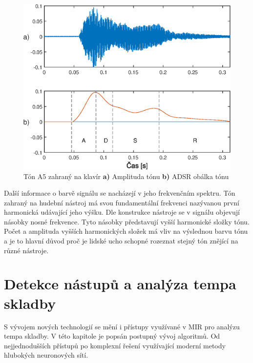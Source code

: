   \begin{figure}[H]
    \centering
    \includegraphics[width = 0.8\linewidth]{obrazky/ADSR.eps}
    \caption{Tón A5 zahraný na klavír \textbf{a)} Amplituda tónu \textbf{b)} ADSR obálka tónu}
    \label{fig:ADSR_envelope_on_piano_tone}
  \end{figure}

  Další informace o barvě signálu se nacházejí v jeho frekvenčním spektru. 
  Tón zahraný na hudební nástroj má svou fundamentální  frekvenci nazývanou první harmonická udávající jeho výšku.
  Dle konstrukce nástroje se v signálu objevují násobky nosné frekvence.
  Tyto násobky představují vyšší harmonické složky tónu.
  Počet a amplituda vyšších harmonických složek má vliv na výslednou barvu tónu a je to hlavní důvod proč je lidské ucho schopné rozeznat stejný tón znějící na různé nástroje. %


\section{Detekce nástupů a analýza tempa skladby} \label{sec:Detekce_tempa}
S vývojem nových technologií se mění i přístupy využívané v \acs{MIR} pro analýzu tempa skladby. 
V této kapitole je popsán postupný vývoj algoritmů.
Od nejjednodušších přístupů po komplexní řešení využívající moderní metody hlubokých neuronových sítí.

